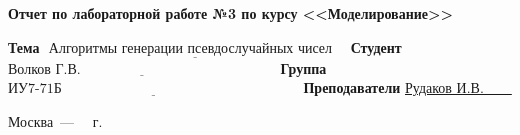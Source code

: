 \begin{titlepage}
	
	\begin{center}
		\Large\textbf{Отчет по лабораторной работе №3 по курсу <<Моделирование>>}
	\end{center}
	
	\noindent\newline\textbf{Тема} $\underline{\text{~Алгоритмы генерации псевдослучайных чисел~~~}}$\newline\newline
	\noindent\textbf{Студент} $\underline{\text{Волков Г.В.~~~~~~~~~~~~~~~~~~~~~~~~~~~~~~~~~~~~~~~~~~}}$\newline\newline
	\noindent\textbf{Группа} $\underline{\text{ИУ7-71Б~~~~~~~~~~~~~~~~~~~~~~~~~~~~~~~~~~~~~~~~~~~~~~~~~~~}}$\newline\newline
	\noindent\textbf{Преподаватели} \underline{Рудаков И.В.~~~~}\newline
	
	\begin{center}
		\vfill
		Москва~---~\the\year
		~г.
	\end{center}
 \restoregeometry
\end{titlepage}

